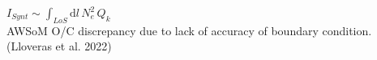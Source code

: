 \documentclass{beamer}
\begin{document}
{{\begin{columns}
$I_{Synt} \sim \int_{LoS} \mathrm{d}l \, N_e^2 \, Q_k$\\


\bu  AWSoM O/C discrepancy due to lack of accuracy of boundary condition.\\ 
\hfill (Lloveras et al. 2022)\\
\end{columns}
}
}




{
}
\end{document}
